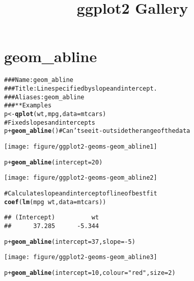 \documentclass[a4paper,titlepage]{tufte-handout}\usepackage{graphicx, color}
\title{ggplot2 Gallery}
\makeatletter
\def\maxwidth{ %
  \ifdim\Gin@nat@width>\linewidth
    \linewidth
  \else
    \Gin@nat@width
  \fi
}
\newcommand{\hlfunctioncall}[1]{\textcolor[rgb]{0.501960784313725,0,0.329411764705882}{\textbf{#1}}}%
\newcommand{\hlstring}[1]{\textcolor[rgb]{0.6,0.6,1}{#1}}%
\newcommand{\hlcomment}[1]{\textcolor[rgb]{0.180392156862745,0.6,0.341176470588235}{#1}}%
\newenvironment{kframe}{%
 \def\at@end@of@kframe{}%
 \ifinner\ifhmode%
  \def\at@end@of@kframe{\end{minipage}}%
  \begin{minipage}{\columnwidth}%
 \fi\fi%
 \def\FrameCommand##1{\hskip\@totalleftmargin \hskip-\fboxsep
 \colorbox{shadecolor}{##1}\hskip-\fboxsep
     \hskip-\linewidth \hskip-\@totalleftmargin \hskip\columnwidth}%
 \MakeFramed {\advance\hsize-\width
   \@totalleftmargin\z@ \linewidth\hsize
   \@setminipage}}%
 {\par\unskip\endMakeFramed%
 \at@end@of@kframe}
\newenvironment{knitrout}{}{} %
\makeatother
\begin{document}
\maketitle
\tableofcontents







\section{geom\_abline}

\begin{knitrout}
\color{fgcolor}\begin{kframe}
\begin{alltt}
\hlcomment{### Name: geom_abline}
\hlcomment{### Title: Line specified by slope and intercept.}
\hlcomment{### Aliases: geom_abline}
\hlcomment{### ** Examples}
p <- \hlfunctioncall{qplot}(wt, mpg, data = mtcars)
\hlcomment{# Fixed slopes and intercepts}
p + \hlfunctioncall{geom_abline}() \hlcomment{# Can't see it - outside the range of the data}
\end{alltt}
\end{kframe}\texttt{[image: figure/ggplot2-geoms-geom\_abline1]} \begin{kframe}\begin{alltt}
p + \hlfunctioncall{geom_abline}(intercept = 20)
\end{alltt}
\end{kframe}\texttt{[image: figure/ggplot2-geoms-geom\_abline2]} \begin{kframe}\begin{alltt}
\hlcomment{# Calculate slope and intercept of line of best fit}
\hlfunctioncall{coef}(\hlfunctioncall{lm}(mpg ~ wt, data = mtcars))
\end{alltt}
\begin{verbatim}
## (Intercept)          wt 
##      37.285      -5.344
\end{verbatim}
\begin{alltt}
p + \hlfunctioncall{geom_abline}(intercept = 37, slope = -5)
\end{alltt}
\end{kframe}\texttt{[image: figure/ggplot2-geoms-geom\_abline3]} \begin{kframe}\begin{alltt}
p + \hlfunctioncall{geom_abline}(intercept = 10, colour = \hlstring{"red"}, size = 2)

\end{alltt}
\end{kframe}
\end{knitrout}
\end{document}
